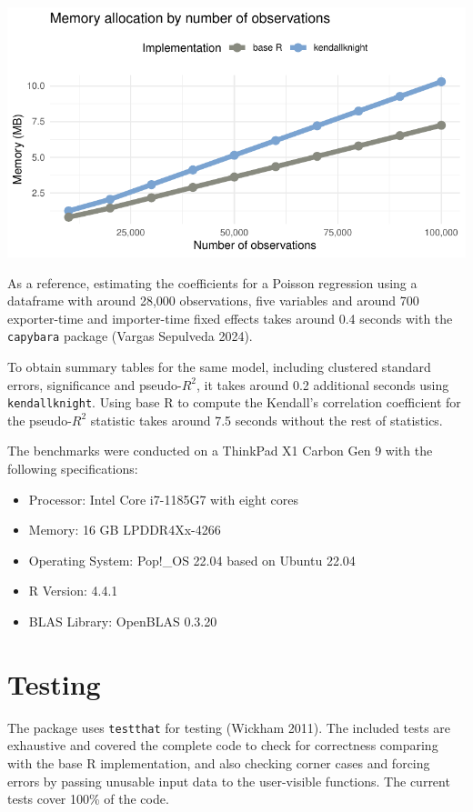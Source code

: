 \documentclass[12pt]{article}
\newcommand{\pandocbounded}[1]{#1}
\providecommand{\tightlist}{\setlength{\itemsep}{0pt}\setlength{\parskip}{0pt}}
\begin{document}
\pandocbounded{\includegraphics[keepaspectratio]{paper_files/figure-pdf/plots2-1.pdf}}

As a reference, estimating the coefficients for a Poisson regression
using a dataframe with around 28,000 observations, five variables and
around 700 exporter-time and importer-time fixed effects takes around
0.4 seconds with the \texttt{capybara} package (Vargas Sepulveda 2024).

To obtain summary tables for the same model, including clustered
standard errors, significance and pseudo-\(R^2\), it takes around 0.2
additional seconds using \texttt{kendallknight}. Using base R to compute
the Kendall's correlation coefficient for the pseudo-\(R^2\) statistic
takes around 7.5 seconds without the rest of statistics.

The benchmarks were conducted on a ThinkPad X1 Carbon Gen 9 with the
following specifications:

\begin{itemize}
\tightlist
\item
  Processor: Intel Core i7-1185G7 with eight cores
\item
  Memory: 16 GB LPDDR4Xx-4266
\item
  Operating System: Pop!\_OS 22.04 based on Ubuntu 22.04
\item
  R Version: 4.4.1
\item
  BLAS Library: OpenBLAS 0.3.20
\end{itemize}

\section{Testing}\label{testing}

The package uses \texttt{testthat} for testing (Wickham 2011). The
included tests are exhaustive and covered the complete code to check for
correctness comparing with the base R implementation, and also checking
corner cases and forcing errors by passing unusable input data to the
user-visible functions. The current tests cover 100\% of the code.
\end{document}

